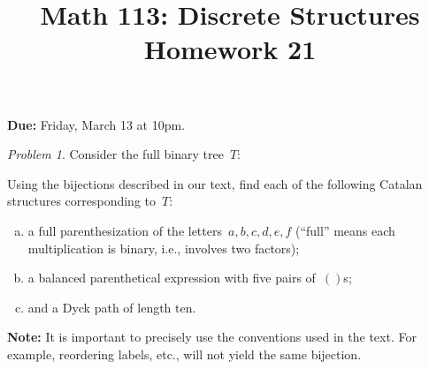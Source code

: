 \documentclass[11pt,twoside]{amsart}
\title{Math 113: Discrete Structures\\ Homework 21}
\theoremstyle{plain}
\theoremstyle{remark}
\newtheorem{prob}{Problem}
\theoremstyle{definition}
\theoremstyle{definition}
\begin{document}
\maketitle

\noindent
\textbf{Due:} Friday, March 13 at 10pm.
\bigskip

\begin{prob}\label{Catalan bijections} Consider the full binary tree~$T$:
  \begin{center}
  \end{center}
  Using the bijections described in our text, find each of the following Catalan
  structures corresponding to~$T$:
  \begin{enumerate}[(a)]
    \item a full parenthesization of the letters~$a,b,c,d,e,f$ (``full'' means
	each multiplication is binary, i.e., involves two factors);
    \item a balanced parenthetical expression with five pairs of~$()$s;
    \item and a Dyck path of length ten.
  \end{enumerate}
  {\bf Note:} It is important to precisely use the conventions used in the
  text.  For example, reordering labels, etc., will not yield the same
  bijection.
\end{prob}
\end{document}
